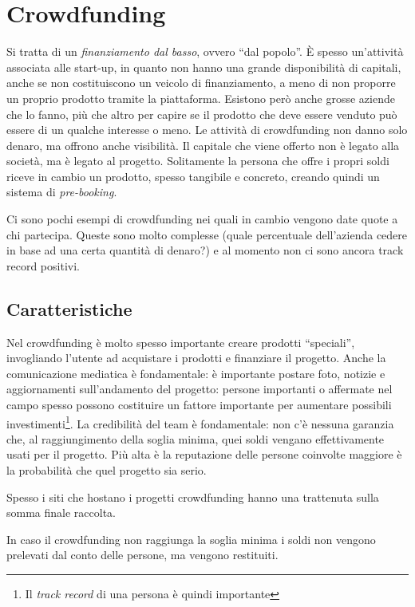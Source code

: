 \section{Crowdfunding}

Si tratta di un \textit{finanziamento dal basso}, ovvero ``dal popolo''. È
spesso un'attività associata alle start-up, in quanto non hanno una grande
disponibilità di capitali, anche se non costituiscono un veicolo di
finanziamento, a meno di non proporre un proprio prodotto tramite la
piattaforma. Esistono però anche grosse aziende che lo fanno, più che altro per
capire se il prodotto che deve essere venduto può essere di un qualche interesse
o meno. Le attività di crowdfunding non danno solo denaro, ma offrono anche
visibilità. Il capitale che viene offerto non è legato alla società, ma è legato
al progetto. Solitamente la persona che offre i propri soldi riceve in cambio un
prodotto, spesso tangibile e concreto, creando quindi un sistema di
\textit{pre-booking}.

Ci sono pochi esempi di crowdfunding nei quali in cambio vengono date quote a
chi partecipa. Queste sono molto complesse (quale percentuale dell'azienda
cedere in base ad una certa quantità di denaro?) e al momento non ci sono
ancora track record positivi.

\subsection{Caratteristiche}

Nel crowdfunding è molto spesso importante creare prodotti ``speciali'',
invogliando l'utente ad acquistare i prodotti e finanziare il progetto. Anche
la comunicazione mediatica è fondamentale: è importante postare foto, notizie e
aggiornamenti sull'andamento del progetto: persone importanti o affermate nel
campo spesso possono costituire un fattore importante per aumentare possibili
investimenti\footnote{Il \textit{track record} di una persona è quindi
importante}. La credibilità del team è fondamentale: non c'è nessuna garanzia
che, al raggiungimento della soglia minima, quei soldi vengano effettivamente
usati per il progetto. Più alta è la reputazione delle persone coinvolte
maggiore è la probabilità che quel progetto sia serio.

Spesso i siti che hostano i progetti crowdfunding hanno una trattenuta sulla
somma finale raccolta.

In caso il crowdfunding non raggiunga la soglia minima i soldi non vengono
prelevati dal conto delle persone, ma vengono restituiti.


